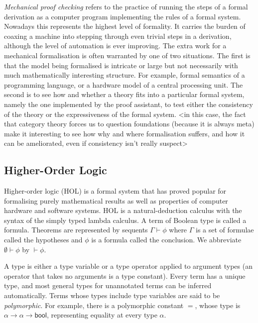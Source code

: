 \documentclass[twoside,titlepage,11pt]{article}
\begin{document}
\emph{Mechanical proof checking} refers to the practice of running the steps of a formal derivation as a computer program implementing the rules of a formal system.
Nowadays this represents the highest level of formality.
It carries the burden of coaxing a machine into stepping through even trivial steps in a derivation, although the level of automation is ever improving.
The extra work for a mechanical formalisation is often warranted by one of two situations.
The first is that the model being formalised is intricate or large but not necessarily with much mathematically interesting structure.
For example, formal semantics of a programming language, or a hardware model of a central processing unit.
The second is to see how and whether a theory fits into a particular formal system, namely the one implemented by the proof assistant, to test either the consistency of the theory or the expressiveness of the formal system.
<in this case, the fact that category theory forces us to question foundations (because it is always meta) make it interesting to see how why and where formalisation suffers, and how it can be ameliorated, even if consistency isn't really suspect>%
\subsection{Higher-Order Logic}%
\newcommand{\bool}{\ensuremath{\mathsf{bool}}}
Higher-order logic (HOL) is a formal system that has proved popular for formalising purely mathematical results as well as properties of computer hardware and software systems.
HOL is a natural-deduction calculus with the syntax of the simply typed lambda calculus.
A term of Boolean type is called a formula.
Theorems are represented by sequents $\Gamma\vdash \phi$ where $\Gamma$ is a set of formulae called the hypotheses and $\phi$ is a formula called the conclusion.
We abbreviate $\emptyset\vdash\phi$ by $\vdash\phi$.%


A type is either a type variable or a type operator applied to argument types (an operator that takes no arguments is a type constant).
Every term has a unique type, and most general types for unannotated terms can be inferred automatically.
Terms whose types include type variables are said to be \emph{polymorphic}.
For example, there is a polymorphic constant $=$, whose type is $\alpha\to\alpha\to\bool$, representing equality at every type $\alpha$.
\end{document}
